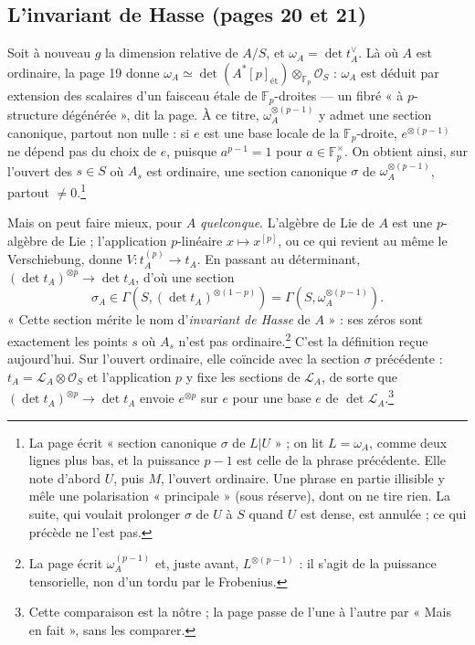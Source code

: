 \documentclass[11pt,a4paper]{article}
\begin{document}
\subsection*{L'invariant de Hasse (pages 20 et 21)}

Soit à nouveau $g$ la dimension relative de $A/S$, et $\omega_A = \det
t_A^\vee$. Là où $A$ est ordinaire, la page 19 donne $\omega_A \simeq
\det(A^*[p]_{\text{ét}}) \otimes_{\mathbb{F}_p} \mathcal{O}_S$ : $\omega_A$ est
déduit par extension des scalaires d'un faisceau étale de
$\mathbb{F}_p$-droites --- un fibré « à $p$-structure dégénérée », dit la
page. À ce titre, $\omega_A^{\otimes(p-1)}$ y admet une section canonique,
partout non nulle : si $e$ est une base locale de la $\mathbb{F}_p$-droite,
$e^{\otimes(p-1)}$ ne dépend pas du choix de $e$, puisque $a^{p-1} = 1$ pour
$a \in \mathbb{F}_p^\times$. On obtient ainsi, sur l'ouvert des $s \in S$ où
$A_s$ est ordinaire, une section canonique $\sigma$ de
$\omega_A^{\otimes(p-1)}$, partout $\neq 0$.\footnote{La page écrit « section
canonique $\sigma$ de $L|U$ » ; on lit $L = \omega_A$, comme deux lignes plus
bas, et la puissance $p-1$ est celle de la phrase précédente. Elle note
d'abord $U$, puis $M$, l'ouvert ordinaire. Une phrase en partie illisible y
mêle une polarisation « principale » (sous réserve), dont on ne tire rien.
La suite, qui voulait prolonger $\sigma$ de $U$ à $S$ quand $U$ est dense, est
annulée ; ce qui précède ne l'est pas.}

Mais on peut faire mieux, pour $A$ \emph{quelconque}. L'algèbre de Lie de $A$ est une $p$-algèbre de Lie ;
l'application $p$-linéaire $x \mapsto x^{[p]}$, ou ce qui revient au même le
Verschiebung, donne $V : t_A^{(p)} \to t_A$. En passant au déterminant,
$(\det t_A)^{\otimes p} \to \det t_A$, d'où une section
\[
\sigma_A \in \Gamma(S, (\det t_A)^{\otimes(1-p)}) = \Gamma(S,
\omega_A^{\otimes(p-1)}) .
\]
« Cette section mérite le nom d'\emph{invariant de Hasse} de $A$ » : ses zéros
sont exactement les points $s$ où $A_s$ n'est pas ordinaire.\footnote{La page
écrit $\omega_A^{(p-1)}$ et, juste avant, $L^{\otimes(p-1)}$ : il s'agit de la
puissance tensorielle, non d'un tordu par le Frobenius.} C'est la définition
reçue aujourd'hui. Sur l'ouvert ordinaire, elle coïncide avec la section
$\sigma$ précédente : $t_A = \mathcal{L}_A \otimes \mathcal{O}_S$ et
l'application $p$ y fixe les sections de $\mathcal{L}_A$, de sorte que
$(\det t_A)^{\otimes p} \to \det t_A$ envoie $e^{\otimes p}$ sur $e$ pour une
base $e$ de $\det \mathcal{L}_A$.\footnote{Cette comparaison est la nôtre ;
la page passe de l'une à l'autre par « Mais en fait », sans les comparer.}
\end{document}
